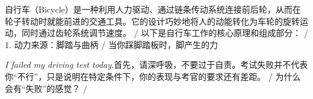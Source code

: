 \begin{multicols}{2}
自\allowbreak{}行\allowbreak{}车\allowbreak{}（\allowbreak{}Bicycl\allowbreak{}e）\allowbreak{}是\allowbreak{}一\allowbreak{}种\allowbreak{}利\allowbreak{}用\allowbreak{}人\allowbreak{}力\allowbreak{}驱\allowbreak{}\allowbreak{}动\allowbreak{}、\allowbreak{}通\allowbreak{}过\allowbreak{}链\allowbreak{}条\allowbreak{}传\allowbreak{}动\allowbreak{}系\allowbreak{}统\allowbreak{}\allowbreak{}连\allowbreak{}接\allowbreak{}前\allowbreak{}后\allowbreak{}轮\allowbreak{}，\allowbreak{}从\allowbreak{}而\allowbreak{}在\allowbreak{}轮\allowbreak{}\allowbreak{}子\allowbreak{}转\allowbreak{}动\allowbreak{}时\allowbreak{}就\allowbreak{}能\allowbreak{}前\allowbreak{}进\allowbreak{}的\allowbreak{}交\allowbreak{}\allowbreak{}通\allowbreak{}工\allowbreak{}具\allowbreak{}。\allowbreak{}它\allowbreak{}的\allowbreak{}设\allowbreak{}计\allowbreak{}巧\allowbreak{}妙\allowbreak{}\allowbreak{}地\allowbreak{}将\allowbreak{}人\allowbreak{}的\allowbreak{}动\allowbreak{}能\allowbreak{}转\allowbreak{}化\allowbreak{}为\allowbreak{}车\allowbreak{}\allowbreak{}轮\allowbreak{}的\allowbreak{}旋\allowbreak{}转\allowbreak{}运\allowbreak{}动\allowbreak{}，\allowbreak{}同\allowbreak{}时\allowbreak{}通\allowbreak{}\allowbreak{}过\allowbreak{}齿\allowbreak{}轮\allowbreak{}系\allowbreak{}统\allowbreak{}调\allowbreak{}节\allowbreak{}速\allowbreak{}度\allowbreak{}。\allowbreak{} / 以\allowbreak{}下\allowbreak{}是\allowbreak{}自\allowbreak{}行\allowbreak{}车\allowbreak{}工\allowbreak{}作\allowbreak{}的\allowbreak{}核\allowbreak{}心\allowbreak{}原\allowbreak{}理\allowbreak{}和\allowbreak{}组\allowbreak{}成\allowbreak{}部\allowbreak{}分\allowbreak{}：\allowbreak{} / 1. 动\allowbreak{}力\allowbreak{}来\allowbreak{}源\allowbreak{}：\allowbreak{}脚\allowbreak{}踏\allowbreak{}与\allowbreak{}曲\allowbreak{}柄\allowbreak{} / 当\allowbreak{}你\allowbreak{}踩\allowbreak{}脚\allowbreak{}踏\allowbreak{}板\allowbreak{}时\allowbreak{}，\allowbreak{}脚\allowbreak{}产\allowbreak{}生\allowbreak{}的\allowbreak{}力\allowbreak{}\par\noindent\textit{I failed my driving test today.}\enspace 首\allowbreak{}先\allowbreak{}，\allowbreak{}请\allowbreak{}深\allowbreak{}呼\allowbreak{}吸\allowbreak{}，\allowbreak{}不\allowbreak{}要\allowbreak{}\allowbreak{}过\allowbreak{}于\allowbreak{}自\allowbreak{}责\allowbreak{}。\allowbreak{}考\allowbreak{}试\allowbreak{}失\allowbreak{}败\allowbreak{}并\allowbreak{}\allowbreak{}不\allowbreak{}代\allowbreak{}表\allowbreak{}你\allowbreak{}“不\allowbreak{}行\allowbreak{}”，\allowbreak{}只\allowbreak{}\allowbreak{}是\allowbreak{}说\allowbreak{}明\allowbreak{}在\allowbreak{}特\allowbreak{}定\allowbreak{}条\allowbreak{}件\allowbreak{}下\allowbreak{}，\allowbreak{}\allowbreak{}你\allowbreak{}的\allowbreak{}表\allowbreak{}现\allowbreak{}与\allowbreak{}考\allowbreak{}官\allowbreak{}的\allowbreak{}要\allowbreak{}求\allowbreak{}\allowbreak{}还\allowbreak{}有\allowbreak{}差\allowbreak{}距\allowbreak{}。\allowbreak{} / 为\allowbreak{}什\allowbreak{}么\allowbreak{}会\allowbreak{}有\allowbreak{}“失\allowbreak{}败\allowbreak{}”的\allowbreak{}感\allowbreak{}觉\allowbreak{}？\allowbreak{} / 
\end{multicols}
